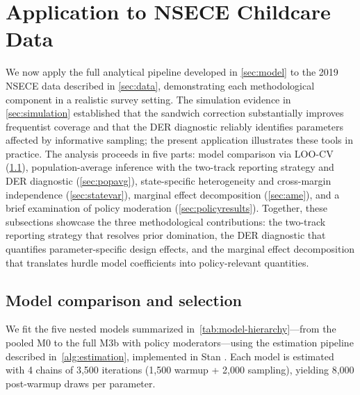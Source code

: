 
\section{Application to NSECE Childcare Data}\label{sec:application}

We now apply the full analytical pipeline developed in \cref{sec:model} to
the 2019 NSECE data described in \cref{sec:data}, demonstrating each
methodological component in a realistic survey setting. The simulation
evidence in \cref{sec:simulation} established that the sandwich correction
substantially improves frequentist coverage and that the DER diagnostic reliably
identifies parameters affected by informative sampling; the present
application illustrates these tools in practice. The analysis proceeds in
five parts: model comparison via LOO-CV (\cref{sec:modelcomp}),
population-average inference with the two-track reporting strategy and DER
diagnostic (\cref{sec:popavg}), state-specific heterogeneity and
cross-margin independence (\cref{sec:statevar}), marginal effect
decomposition (\cref{sec:ame}), and a brief examination of policy
moderation (\cref{sec:policyresults}). Together, these subsections showcase
the three methodological contributions: the two-track reporting strategy
that resolves prior domination, the DER diagnostic that quantifies
parameter-specific design effects, and the marginal effect decomposition
that translates hurdle model coefficients into policy-relevant quantities.


\subsection{Model comparison and selection}\label{sec:modelcomp}

We fit the five nested models summarized in~\cref{tab:model-hierarchy}---from
the pooled M0 to the full M3b with policy moderators---using the estimation
pipeline described in~\cref{alg:estimation}, implemented in Stan
\citep{CarpenterEtAl2017}. Each model is estimated with 4
chains of 3,500 iterations (1,500 warmup + 2,000 sampling), yielding 8,000
post-warmup draws per parameter.

